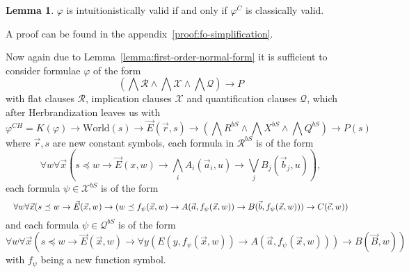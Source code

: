 \documentclass{easychair}
\theoremstyle{definition}
\theoremstyle{definition}
\theoremstyle{definition}
\newtheorem{lemma}[theorem]{Lemma}
\theoremstyle{definition}
\theoremstyle{definition}
\theoremstyle{definition}
\theoremstyle{definition}
\begin{document}
\begin{lemma}\label{lemma:fo-simplification}
	$\varphi$ is intuitionistically valid if and only if $\varphi^C$ is classically valid.
\end{lemma}

A proof can be found in the appendix~\ref*{proof:fo-simplification}.

Now again due to Lemma~\ref{lemma:first-order-normal-form} it is sufficient to consider formulae $\varphi$ of the form $$\left(\bigwedge\mathcal R\wedge\bigwedge\mathcal X\wedge\bigwedge\mathcal Q\right)\to P$$ with flat clauses $\mathcal R$, implication clauses $\mathcal X$ and quantification clauses $\mathcal Q$, which after Herbrandization leaves us with $$\varphi^{CH} = K(\varphi)\to\text{World}(s)\to\vec E(\vec r, s) \to \left(\bigwedge R^{bS}\wedge \bigwedge X^{bS}\wedge\bigwedge Q^{bS}\right)\to P(s)$$
where $\vec r, s$ are new constant symbols, each formula in $\mathcal R^{bS}$ is of the form
$$\forall w \forall \vec x(s\preceq w\to\vec E(x, w)\to\bigwedge_i A_i(\vec a_i, u)\to\bigvee_j B_j(\vec b_j, u)),$$
each formula $\psi\in\mathcal X^{bS}$ is of the form
$$
	\resizebox{\hsize}{!}{$\forall w\forall\vec x(s\preceq w\to\vec E(\vec x, w)\to (w\preceq f_\psi(\vec x, w)\to A(\vec a, f_\psi(\vec x, w))\to B(\vec b, f_\psi(\vec x, w)))\to C(\vec c, w))$}
$$
and each formula $\psi\in\mathcal Q^{bS}$ is of the form
$$\forall w\forall\vec x(s\preceq w\to\vec E(\vec x, w)\to \forall y(E(y, f_\psi(\vec x, w))\to A(\vec a, f_\psi(\vec x, w)))\to B(\vec B, w))$$
with $f_\psi$ being a new function symbol.
\end{document}
